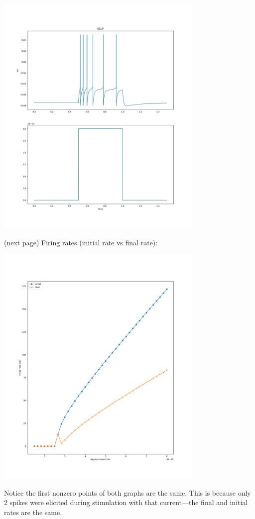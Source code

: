 \documentclass{report}
\begin{document}
\begin{center}
\includegraphics[width=10cm]{11}\\
\end{center}
(next page)\newpage
\noindent Firing rates (initial rate vs final rate):
\begin{center}
\includegraphics[width=10cm]{12}\\
\end{center}
Notice the first nonzero points of both graphs are the same. This is because only 2 spikes were elicited
during stimulation with that current---the final and initial rates are the same.
\end{document}
